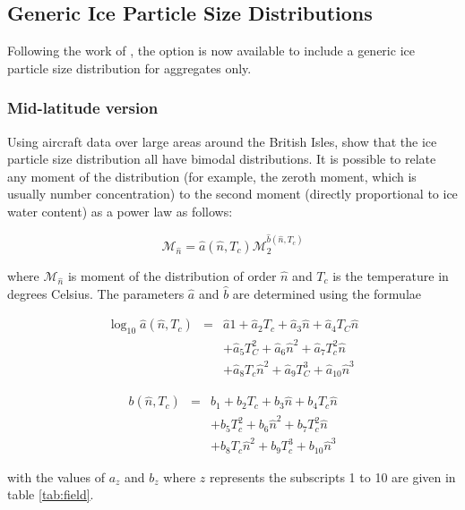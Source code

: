 \documentclass{UMDP_article}
\begin{document}
\subsection{Generic Ice Particle Size Distributions }
\label{sec:field_psd}

Following the work of \cite{Field:etal:2005}, the option is now available
to include a generic ice particle size distribution for aggregates only. 

\subsubsection{Mid-latitude version}
\label{sec:field_psd_ml}
Using aircraft data over large areas around the British Isles, 
\cite{Field:etal:2005} show that
the ice particle size distribution all have bimodal
distributions. It is possible to relate any moment of the distribution 
(for example, the zeroth moment, which is usually number concentration) 
to the second moment (directly proportional to ice water content) as a 
power law as follows:

\begin{equation}
\label{eq:field1}
\mathcal{M}_{\hat{n}} = \hat{a}(\hat{n}, T_c)\mathcal{M}_2^{\hat{b}(\hat{n}, T_c)} 
\end{equation}

where $\mathcal{M}_{\hat{n}}$ is moment of the distribution of order $\hat{n}$ and $T_c$
is the temperature in degrees Celsius. The parameters $\hat{a}$ and $\hat{b}$
are determined using the formulae

\begin{eqnarray}
\label{eq:fielda}
\log_{10} \hat{a}(\hat{n}, T_c) &=& \hat{a}1 + \hat{a}_2 T_c + \hat{a}_3 \hat{n} 
+ \hat{a}_4 T_C \hat{n} \nonumber \\
& & + \hat{a}_5 T_C^2 + \hat{a}_6 \hat{n}^2 + \hat{a}_7 T_c^2 \hat{n} \nonumber \\
& & + \hat{a}_8 T_c \hat{n}^2 + \hat{a}_9 T_C^3 + \hat{a}_{10} \hat{n}^3 
\end{eqnarray}

\begin{eqnarray}
\label{eq:fieldb}
b(\hat{n}, T_c) &=& b_1 + b_2 T_c + b_3 \hat{n} + b_4 T_c \hat{n} \nonumber \\
& & + b_5 T_c^2 + b_6 \hat{n}^2 + b_7 T_c^2 \hat{n} \nonumber \\
& & + b_8 T_c \hat{n}^2 + b_9 T_c^3 + b_{10}\hat{n}^3
\end{eqnarray}

with the values of $a_z$ and $b_z$ where $z$ represents the subscripts 1 to 10 
are given in table \ref{tab:field}.
\end{document}
